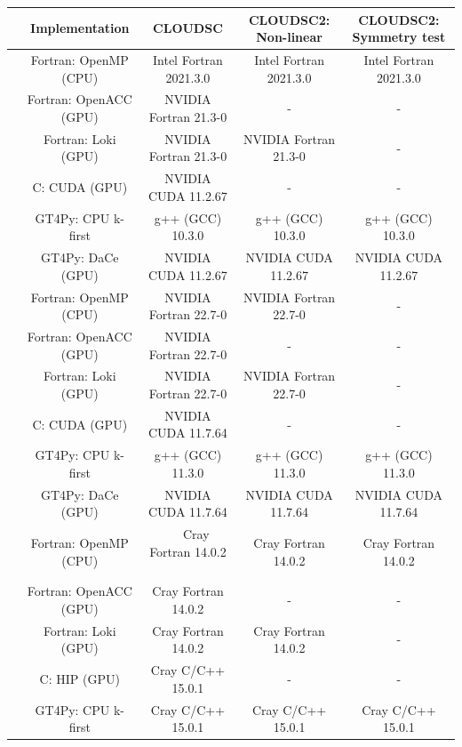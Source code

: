 \documentclass[gmd,manuscript,online]{copernicus}
\begin{document}
	\begin{table}[t!]
		\renewcommand{\arraystretch}{1.4}
		\centering
		\begin{footnotesize}
			\begin{tabular}{|c|c|c|c|c|}
				\hline
				& \textbf{Implementation} & \textbf{CLOUDSC} & \textbf{CLOUDSC2: Non-linear} & \textbf{CLOUDSC2: Symmetry test} \\
				\hline
				\multirow{6}{*}{\rotatebox[origin=c]{90}{\textbf{Piz Daint}}} & Fortran: OpenMP (CPU) & Intel Fortran 2021.3.0 & Intel Fortran 2021.3.0 & Intel Fortran 2021.3.0 \\
				& Fortran: OpenACC (GPU) & NVIDIA Fortran 21.3-0 & - & - \\
				& Fortran: Loki (GPU) & NVIDIA Fortran 21.3-0 & NVIDIA Fortran 21.3-0 & - \\
				& C: CUDA (GPU) & NVIDIA CUDA 11.2.67 & - & - \\
				& GT4Py: CPU k-first & g++ (GCC) 10.3.0 & g++ (GCC) 10.3.0 & g++ (GCC) 10.3.0 \\
				& GT4Py: DaCe (GPU) & NVIDIA CUDA 11.2.67 & NVIDIA CUDA 11.2.67 & NVIDIA CUDA 11.2.67 \\
				\hline
				\multirow{6}{*}{\rotatebox[origin=c]{90}{\textbf{MeluXina}}} & Fortran: OpenMP (CPU) & NVIDIA Fortran 22.7-0 & NVIDIA Fortran 22.7-0 & - \\
				& Fortran: OpenACC (GPU) & NVIDIA Fortran 22.7-0 & - & - \\
				& Fortran: Loki (GPU) & NVIDIA Fortran 22.7-0 & NVIDIA Fortran 22.7-0 & - \\
				& C: CUDA (GPU) & NVIDIA CUDA 11.7.64 & - & - \\
				& GT4Py: CPU k-first & g++ (GCC) 11.3.0 & g++ (GCC) 11.3.0 & g++ (GCC) 11.3.0 \\
				& GT4Py: DaCe (GPU) & NVIDIA CUDA 11.7.64 & NVIDIA CUDA 11.7.64 & NVIDIA CUDA 11.7.64 \\
				\hline
				\multirow{6}{*}{\rotatebox[origin=c]{90}{\textbf{LUMI}}} & Fortran: OpenMP (CPU) & ~~ Cray Fortran 14.0.2 ~~ & Cray Fortran 14.0.2 & Cray Fortran 14.0.2 \\
				& Fortran: OpenACC (GPU) & Cray Fortran 14.0.2 & - & - \\
				& Fortran: Loki (GPU) & Cray Fortran 14.0.2 & Cray Fortran 14.0.2 & - \\
				& C: HIP (GPU) & Cray C/C++ 15.0.1 & - & - \\
				& GT4Py: CPU k-first & Cray C/C++ 15.0.1 & Cray C/C++ 15.0.1 & Cray C/C++ 15.0.1 \\

\end{tabular}
\end{footnotesize}
\end{table}
\end{document}
